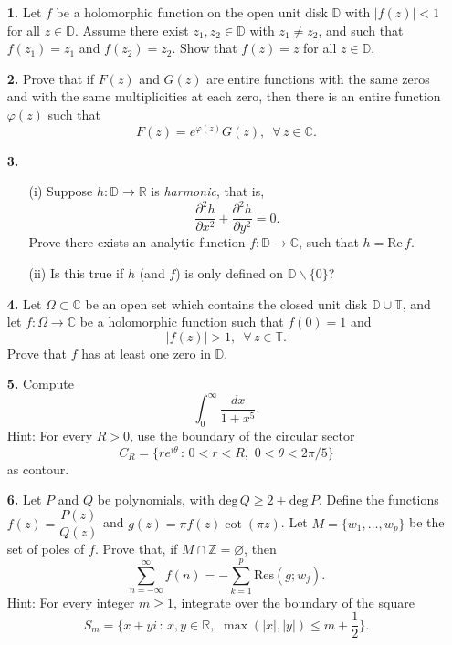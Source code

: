 \documentclass[12pt]{article}
\newcommand{\D}{\mathbb{D} }
\newcommand{\T}{\mathbb{T} }
\newcommand{\C}{\mathbb{C} }
\begin{document}
\begin{itemize}
\item[{\bf 1.}] Let $f$ be a holomorphic function on the open unit
disk $\mathbb{D} $ with $|f (z)|<1$ for all $z\in\mathbb{D}$. Assume there exist
$z_1,z_2\in\mathbb{D}$ with $z_{1}\neq z_{2}$, and such that
$f (z_{1})=z_{1}$ and
$f (z_{2})=z_{2}$. Show that $f (z)=z$ for all $z\in\mathbb{D}$.

\item[{\bf 2.}]
Prove that if $F (z)$ and $G (z)$ are entire functions
with the same zeros and with the same multiplicities at each zero, then
there is an entire function $\varphi (z)$ such that
\[
F (z)=e^{\varphi (z)}G (z),\,\,\,\forall\,z\in\mathbb{C}.
\]

\item[{\bf 3.}]
\begin{itemize}
\item[(i)] Suppose $h:\mathbb{D}\to\mathbb{R}$ is {\em harmonic}, that is,
$$\frac{\partial^2h}{\partial x^2}+\frac{\partial^2h}{\partial y^2}=0.$$
Prove there exists an analytic function $f:\mathbb{D}\to\mathbb{C}$, such that
$h=\text{Re}\,f.$
\item[(ii)] Is this true if $h$ (and $f$) is only defined on $\mathbb{D}\smallsetminus\{0\}$?
\end{itemize}
\newpage


\item[{\bf 4.}]
Let $\Omega\subset\C$ be an open set which contains the closed
unit disk $\D \cup\T$, and let $f:\Omega\to\C$ be a holomorphic function such that
$f(0)=1$ and
$$
|f(z)|>1,\,\,\,\forall\,z\in\T.$$
Prove that $f$ has at least one zero in $\D$.

\item[{\bf 5.}] Compute
$$
\int_0^\infty \frac{dx}{1+x^5}.$$
{\footnotesize
{\sc Hint:} For every $R>0$, use the boundary of the circular sector
$$C_R=\{re^{i\theta}\,:\,0<r<R,\,\,0<\theta<2\pi/5\}$$
as contour.}


\item[{\bf 6.}] Let $P$ and $Q$ be polynomials, with
$\text{deg}\,Q\geq 2+\text{deg}\,P$.
Define the functions
$f(z)=\dfrac{P(z)}{Q(z)}$ and $g(z)=\pi f(z)\cot (\pi z)$.
Let $M=\{w_1,\dots,w_p\}$ be the set of poles of $f$.
Prove that, if $M\cap\mathbb{Z}=\varnothing$, then
$$
\sum_{n=-\infty}^\infty f(n)=-\sum_{k=1}^p\text{Res}(g;w_j).$$
{\footnotesize
{\sc Hint:} For every integer $m\geq 1$,
integrate over the boundary of the square
$$S_m=\big\{x+yi\,:\,x,y\in\mathbb{R},\,\,\max(|x|,|y|)
\leq m+\frac 12\big\}.$$
}



\end{itemize}
\end{document}
